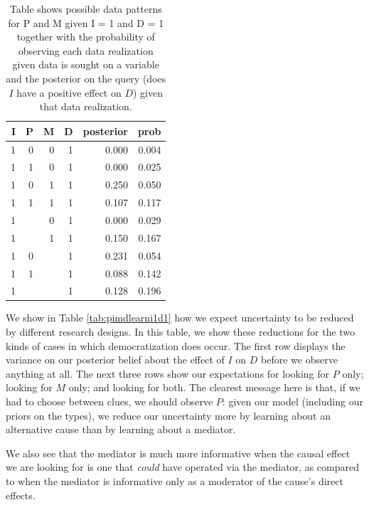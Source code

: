 \documentclass[
  12pt,
]{book}
\begin{document}
\begin{table}

\caption{\label{tab:possibleoutcomespimdi1}Table shows possible data patterns for P and M given I = 1 and D = 1 together with the probability of observing each data realization given data is sought on a variable and the posterior on the query (does $I$ have a positive effect on $D$) given that data realization.}
\centering
\begin{tabular}[t]{r|r|r|r|r|r}
\hline
I & P & M & D & posterior & prob\\
\hline
1 & 0 & 0 & 1 & 0.000 & 0.004\\
\hline
1 & 1 & 0 & 1 & 0.000 & 0.025\\
\hline
1 & 0 & 1 & 1 & 0.250 & 0.050\\
\hline
1 & 1 & 1 & 1 & 0.107 & 0.117\\
\hline
1 &  & 0 & 1 & 0.000 & 0.029\\
\hline
1 &  & 1 & 1 & 0.150 & 0.167\\
\hline
1 & 0 &  & 1 & 0.231 & 0.054\\
\hline
1 & 1 &  & 1 & 0.088 & 0.142\\
\hline
1 &  &  & 1 & 0.128 & 0.196\\
\hline
\end{tabular}
\end{table}

We show in Table \ref{tab:pimdlearni1d1} how we expect uncertainty to be reduced by different research designs. In this table, we show these reductions for the two kinds of cases in which democratization does occur. The first row displays the variance on our posterior belief about the effect of \(I\) on \(D\) before we observe anything at all. The next three rows show our expectations for looking for \(P\) only; looking for \(M\) only; and looking for both. The clearest message here is that, if we had to choose between clues, we should observe \(P\): given our model (including our priors on the types), we reduce our uncertainty more by learning about an alternative cause than by learning about a mediator.

We also see that the mediator is much more informative when the causal effect we are looking for is one that \emph{could} have operated via the mediator, as compared to when the mediator is informative only as a moderator of the cause's direct effects.
\end{document}
